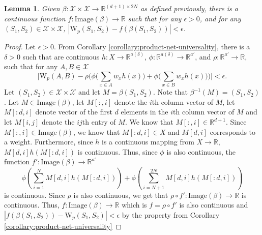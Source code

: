 \documentclass[12pt]{article}
\newcommand{\R}{\mathbb R}
\newtheorem{lemma}[theorem]{Lemma}
\begin{document}
\begin{lemma}
\label{lemma:mlp-wasserstein}
    Given $\beta: \mathcal{X} \times \mathcal{X} \to \R^{(d+ 1) \times 2N}$ as defined previously, there is a continuous function $f: \mathrm{Image}(\beta) \to \R$ such that for any $\epsilon > 0$, and for any $(S_1, S_2 )\in \mathcal{X} \times\mathcal{X}$, $|\mathrm{W}_p(S_1, S_2) - f(\beta(S_1, S_2))| < \epsilon$. 
\end{lemma}
\begin{proof}
    Let $\epsilon > 0$. From Corollary \ref{corollary:product-net-universality}, there is a $\delta > 0$ such that are continuous $h: X \to \R^{a(\delta)}$, $\phi: \R^{a(\delta)} \to \R^{a'}$, and $\rho: \R^{a'} \to \R$, such that for any $A, B \in \mathcal{X}$
    \begin{equation*}
        \Bigg|\mathrm{W}_p(A, B) - \rho\Big(\phi\Big(\sum_{x \in A} w_x h(x)\Big) + \phi\Big(\sum_{x \in B}w_x h(x)\Big)\Big) \Bigg| < \epsilon.
    \end{equation*}
    Let $(S_1, S_2) \in \mathcal{X} \times \mathcal{X}$ and let $M = \beta(S_1, S_2)$. Note that $\beta^{-1}(M) = (S_1, S_2)$.
    Let $M \in \mathrm{Image}(\beta)$, let $M[:, i]$ denote the $i$th column vector of $M$, let $M[:d, i]$ denote vector of the first $d$ elements in the $i$th column vector of $M$ and let $M[i, j]$ denote the $ij$th entry of $M$. We know that $M[:, i] \in \R^{d + 1}$. Since $M[:, i] \in \mathrm{Image}(\beta)$, we know that $M[:d, i] \in X$ and $M[d, i]$ corresponds to a weight.
    Furthermore, since $h$ is a continuous mapping from $X \to \R$, $M[d, i]h(M[:d, i])$ is continuous. Thus, since $\phi$ is also continuous, the function $f': \mathrm{Image}(\beta) \to \R^{a'}$
    \begin{equation*}
        \phi(\sum_{i = 1}^N M[d, i]h(M[:d, i]) ) + \phi(\sum_{i = N + 1}^{2N} M[d, i]h(M[:d, i]))
    \end{equation*}
     is continuous. Since $\rho$ is also continuous, we get that $\rho \circ f': \mathrm{Image}(\beta) \to \R$ is continuous. Thus, $f: \mathrm{Image}(\beta) \to \R$ which is $f = \rho \circ f'$ is also continuous and $|f(\beta(S_1, S_2)) - \mathrm{W}_p(S_1, S_2)| < \epsilon$ by the property from Corollary \ref{corollary:product-net-universality}
\end{proof}
    
\end{document}
